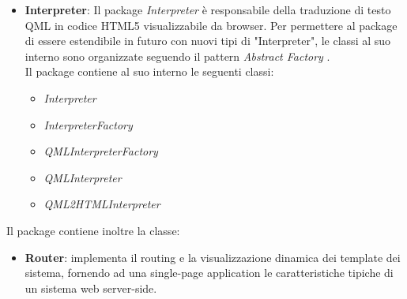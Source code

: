 \begin{itemize}
	\item \textbf{Interpreter}:
	Il package \emph{Interpreter} è responsabile della traduzione di testo QML in codice HTML5 visualizzabile da browser. Per permettere al package di essere estendibile in futuro con nuovi tipi di "Interpreter", le classi al suo interno sono organizzate seguendo il pattern \emph{Abstract Factory} . \\
	Il package contiene al suo interno le seguenti classi:
	\begin{itemize}
	\item \textit{Interpreter}
	\item \textit{InterpreterFactory}
	\item \textit{QMLInterpreterFactory}
	\item \textit{QMLInterpreter}
	\item \textit{QML2HTMLInterpreter}
	\end{itemize}
	
	\end{itemize}
	
Il package contiene inoltre la classe:
\begin{itemize}
	\item\textbf{Router}: implementa il routing e la visualizzazione dinamica dei template dei sistema, fornendo ad una single-page application le caratteristiche tipiche di un sistema web server-side.
\end{itemize}